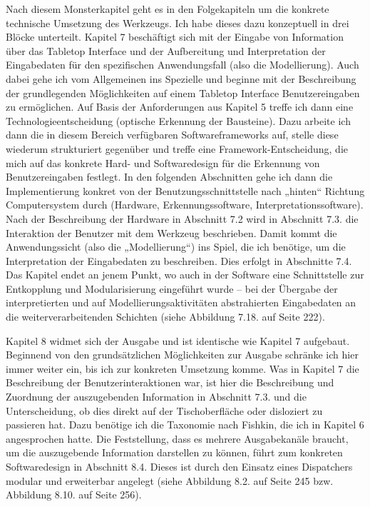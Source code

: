 \todo Nach diesem Monsterkapitel geht es in den Folgekapiteln um die konkrete technische Umsetzung des Werkzeugs. Ich habe dieses dazu konzeptuell in drei Blöcke unterteilt. Kapitel 7 beschäftigt sich mit der Eingabe von Information über das Tabletop Interface und der Aufbereitung und Interpretation der Eingabedaten  für den spezifischen Anwendungsfall (also die Modellierung). Auch dabei gehe ich vom Allgemeinen ins Spezielle und beginne mit der Beschreibung der grundlegenden Möglichkeiten auf einem Tabletop Interface Benutzereingaben zu ermöglichen. Auf Basis der Anforderungen aus Kapitel 5 treffe ich dann eine Technologieentscheidung (optische Erkennung der Bausteine). Dazu arbeite ich dann die in diesem Bereich verfügbaren Softwareframeworks auf, stelle diese wiederum strukturiert gegenüber und treffe eine Framework-Entscheidung, die mich auf das konkrete Hard- und Softwaredesign für die Erkennung von Benutzereingaben festlegt. In den folgenden Abschnitten gehe ich dann die Implementierung konkret von der Benutzungsschnittstelle nach „hinten“ Richtung Computersystem durch (Hardware, Erkennungssoftware, Interpretationssoftware). Nach der Beschreibung der Hardware in Abschnitt 7.2 wird in Abschnitt 7.3. die Interaktion der Benutzer mit dem Werkzeug beschrieben. Damit kommt die Anwendungssicht (also die „Modellierung“) ins Spiel, die ich benötige, um die Interpretation der Eingabedaten zu beschreiben. Dies erfolgt in Abschnitte 7.4. Das Kapitel endet an jenem Punkt, wo auch in der Software eine Schnittstelle zur Entkopplung und Modularisierung eingeführt wurde – bei der Übergabe der interpretierten und auf Modellierungsaktivitäten abstrahierten Eingabedaten an die weiterverarbeitenden Schichten (siehe Abbildung 7.18. auf Seite 222).

\todo Kapitel 8 widmet sich der Ausgabe und ist identische wie Kapitel 7 aufgebaut. Beginnend von den grundsätzlichen Möglichkeiten zur Ausgabe schränke ich hier immer weiter ein, bis ich zur konkreten Umsetzung komme. Was in Kapitel 7 die Beschreibung der Benutzerinteraktionen war, ist hier die Beschreibung und Zuordnung der auszugebenden Information in Abschnitt 7.3. und die Unterscheidung, ob dies direkt auf der Tischoberfläche oder disloziert zu passieren hat. Dazu benötige ich die Taxonomie nach Fishkin, die ich in Kapitel 6 angesprochen hatte. Die Feststellung, dass es mehrere Ausgabekanäle braucht, um die auszugebende Information darstellen zu können, führt zum konkreten Softwaredesign in Abschnitt 8.4. Dieses ist durch den Einsatz eines Dispatchers modular und erweiterbar angelegt (siehe Abbildung 8.2. auf Seite 245 bzw. Abbildung 8.10. auf Seite 256).

